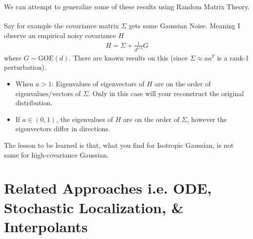 \begin{sidework}
	We can attempt to generalize some of these results using Random Matrix Theory.\\
	\\
	Say for example the covariance matrix $\Sigma$ gets some Gaussian Noise. Meaning I observe an empirical noisy covariance $H$
	\begin{align}
		H = \Sigma + \frac{1}{d^{a/2}} G
	\end{align}
	where $G \sim \text{GOE}(d)$. There are known results on this (since $\Sigma \approx aa^T$ is a rank-1 perturbation).
	\begin{itemize}
		\item When $a > 1$: Eigenvalues of eigenvectors of $H$ are on the order of eigenvalues/vectors of $\Sigma$. Only in this case will your reconstruct the original distribution.
		\item If $a \in (0,1)$, the eigenvalues of $H$ are on the order of $\Sigma$, however the eigenvectors differ in directions.
	\end{itemize}
	The lesson to be learned is that, what you find for Isotropic Gaussian, is not same for high-covariance Gaussian.
\end{sidework}

\section{Related Approaches i.e. ODE, Stochastic Localization, \& Interpolants}
